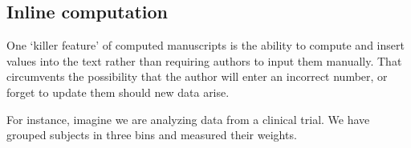\documentclass[smallextended]{svjour3}       %
\begin{document}
\hypertarget{sec:1}{%
\subsection{Inline computation}\label{sec:1}}

One `killer feature' of computed manuscripts is the ability to compute and insert values into the text rather than requiring authors to input them manually. That circumvents the possibility that the author will enter an incorrect number, or forget to update them should new data arise.

For instance, imagine we are analyzing data from a clinical trial. We have grouped subjects in three bins and measured their weights.

\begin{table}


\end{table}
\end{document}
